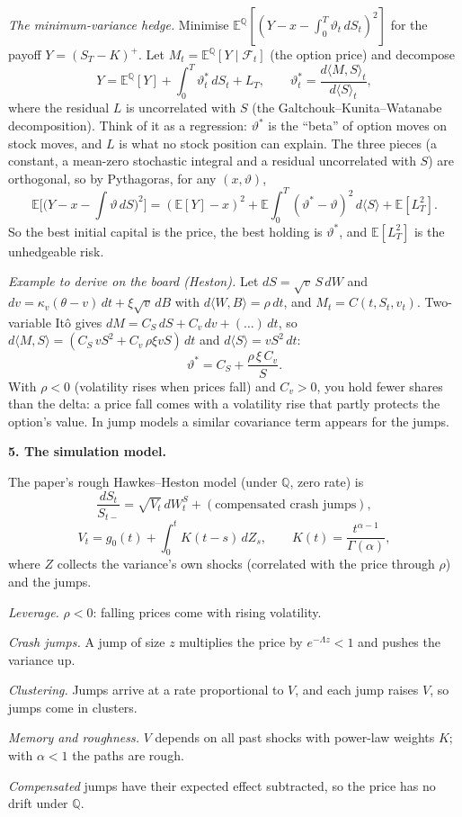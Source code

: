 \documentclass[10pt,leqno]{amsart}
\newcommand{\heading}[1]{\medskip\noindent\textbf{#1}\par}
\begin{document}
\noindent\emph{The minimum-variance hedge.} Minimise
$\mathbb{E}^{\mathbb{Q}}[(Y-x-\int_0^T\vartheta_t\,dS_t)^2]$ for the payoff
$Y=(S_T-K)^+$. Let $M_t=\mathbb{E}^{\mathbb{Q}}[Y\mid\mathcal F_t]$ (the option price) and
decompose
\[
Y=\mathbb{E}^{\mathbb{Q}}[Y]+\int_0^T\vartheta^*_t\,dS_t+L_T,\qquad
\vartheta^*_t=\frac{d\langle M,S\rangle_t}{d\langle S\rangle_t},
\]
where the residual $L$ is uncorrelated with $S$ (the Galtchouk--Kunita--Watanabe
decomposition). Think of it as a regression: $\vartheta^*$ is the ``beta'' of
option moves on stock moves, and $L$ is what no stock position can explain. The
three pieces (a constant, a mean-zero stochastic integral and a residual
uncorrelated with $S$) are orthogonal, so by Pythagoras, for any
$(x,\vartheta)$,
\[
\mathbb{E}\Big[\Big(Y-x-\int\vartheta\,dS\Big)^2\Big]
=(\mathbb{E}[Y]-x)^2+\mathbb{E}\int_0^T(\vartheta^*-\vartheta)^2\,d\langle S\rangle+\mathbb{E}[L_T^2].
\]
So the best initial capital is the price, the best holding is $\vartheta^*$, and
$\mathbb{E}[L_T^2]$ is the unhedgeable risk.

\noindent\emph{Example to derive on the board (Heston).} Let $dS=\sqrt v\,S\,dW$
and $dv=\kappa_v(\theta-v)\,dt+\xi\sqrt v\,dB$ with $d\langle W,B\rangle=\rho\,dt$,
and $M_t=C(t,S_t,v_t)$. Two-variable It\^o gives
$dM=C_S\,dS+C_v\,dv+(\dots)\,dt$, so
$d\langle M,S\rangle=(C_S\,vS^2+C_v\,\rho\xi vS)\,dt$ and $d\langle S\rangle=vS^2\,dt$:
\[
\vartheta^*=C_S+\frac{\rho\,\xi\,C_v}{S}.
\]
With $\rho<0$ (volatility rises when prices fall) and $C_v>0$, you hold fewer
shares than the delta: a price fall comes with a volatility rise that partly
protects the option's value. In jump models a similar covariance term appears
for the jumps.

\heading{5. The simulation model.}
\noindent The paper's rough Hawkes--Heston model (under $\mathbb{Q}$, zero rate) is
\[
\frac{dS_t}{S_{t-}} = \sqrt{V_t}\,dW^S_t + (\text{compensated crash jumps}),
\]
\[
V_t = g_0(t) + \int_0^t K(t-s)\,dZ_s,\qquad K(t)=\frac{t^{\alpha-1}}{\Gamma(\alpha)},
\]
where $Z$ collects the variance's own shocks (correlated with the price through
$\rho$) and the jumps.
\begin{compactitem}
\item \emph{Leverage.} $\rho<0$: falling prices come with rising volatility.
\item \emph{Crash jumps.} A jump of size $z$ multiplies the price by
$e^{-\Lambda z}<1$ and pushes the variance up.
\item \emph{Clustering.} Jumps arrive at a rate proportional to $V$, and each jump
raises $V$, so jumps come in clusters.
\item \emph{Memory and roughness.} $V$ depends on all past shocks with power-law
weights $K$; with $\alpha<1$ the paths are rough.
\item \emph{Compensated} jumps have their expected effect subtracted, so the
price has no drift under $\mathbb{Q}$.
\end{compactitem}
\end{document}
